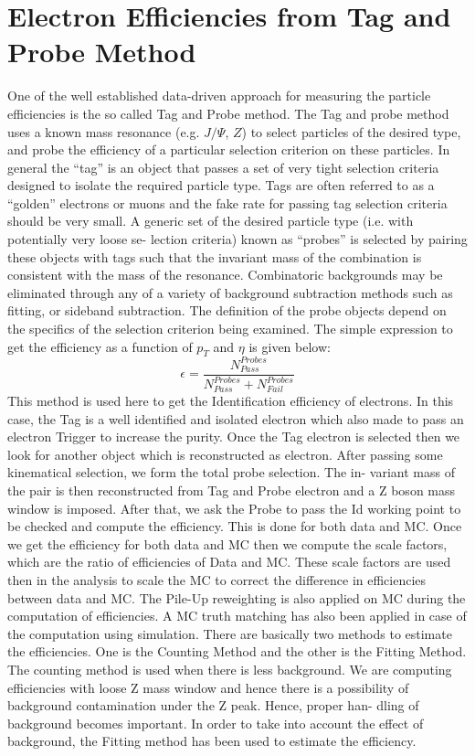 \documentclass[PhD,binding=0.6cm]{../sapthesis}
\begin{document}
\chapter{Electron  Efficiencies from Tag and Probe Method}
\label{TP}
One of the well established data-driven approach for measuring the particle efficiencies is the
so called Tag and Probe method. The Tag and probe method uses a known mass resonance (e.g. $J/\Psi$, $Z$) to select particles of the desired type, and probe the efficiency of a particular
selection criterion on these particles. In general the “tag” is an object that passes a set of very
tight selection criteria designed to isolate the required particle type. Tags are often referred
to as a “golden” electrons or muons and the fake rate for passing tag selection criteria should
be very small. A generic set of the desired particle type (i.e. with potentially very loose se-
lection criteria) known as “probes” is selected by pairing these objects with tags such that the
invariant mass of the combination is consistent with the mass of the resonance. Combinatoric
backgrounds may be eliminated through any of a variety of background subtraction methods
such as fitting, or sideband subtraction. The definition of the probe objects depend on the specifics of the selection criterion being examined. The simple expression to get the efficiency as a function of $p_T$ and $\eta$ is given below:
\begin{equation}
\epsilon=\frac{N_{Pass}^{Probes}}{N_{Pass}^{Probes}+N_{Fail}^{Probes}}
\end{equation}
This method is used here to get the Identification efficiency of electrons. In this case, the Tag is a
well identified and isolated electron which also made to pass an electron Trigger to increase the
purity. Once the Tag electron is selected then we look for another object which is reconstructed
as electron. After passing some kinematical selection, we form the total probe selection. The in-
variant mass of the pair is then reconstructed from Tag and Probe electron and a Z boson mass
window is imposed. After that, we ask the Probe to pass the Id working point to be checked
and compute the efficiency. This is done for both data and MC. Once we get the efficiency
for both data and MC then we compute the scale factors, which are the ratio of efficiencies of
Data and MC. These scale factors are used then in the analysis to scale the MC to correct the
difference in efficiencies between data and MC. The Pile-Up reweighting is also applied on MC
during the computation of efficiencies. A MC truth matching has also been applied in case of
the computation using simulation. There are basically two methods to estimate the efficiencies.
One is the Counting Method and the other is the Fitting Method. The counting method is used
when there is less background. We are computing efficiencies with loose Z mass window and
hence there is a possibility of background contamination under the Z peak. Hence, proper han-
dling of background becomes important. In order to take into account the effect of background,
the Fitting method has been used to estimate the efficiency.


\end{document}
